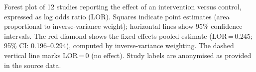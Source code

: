 \caption{Forest plot of 12 studies reporting the effect of an intervention versus control, expressed as log odds ratio (LOR). Squares indicate point estimates (area proportional to inverse-variance weight); horizontal lines show 95\% confidence intervals. The red diamond shows the fixed-effects pooled estimate (LOR\,=\,0.245; 95\% CI: 0.196--0.294), computed by inverse-variance weighting. The dashed vertical line marks LOR\,=\,0 (no effect). Study labels are anonymised as provided in the source data.}
